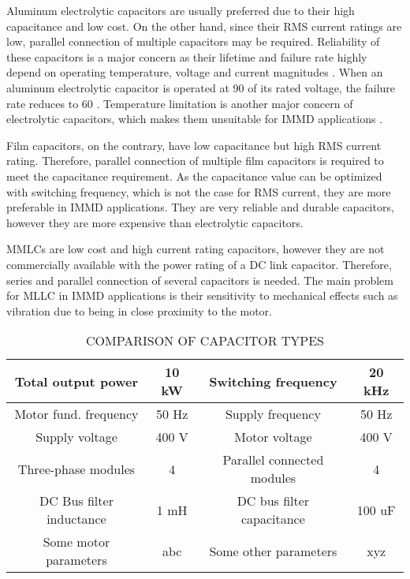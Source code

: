 \documentclass[conference,a4paper,twocolumn]{IEEEtran}
\begin{document}
Aluminum electrolytic capacitors are usually preferred due to their high capacitance and low cost. On the other hand, since their RMS current ratings are low, parallel connection of multiple capacitors may be required. Reliability of these capacitors is a major concern as their lifetime and failure rate highly depend on operating temperature, voltage and current magnitudes \cite{Su2010}. When an aluminum electrolytic capacitor is operated at 90 of its rated voltage, the failure rate reduces to 60 \cite{Bianchi2003}. Temperature limitation is another major concern of electrolytic capacitors, which makes them unsuitable for IMMD applications \cite{Brown2007}.

Film capacitors, on the contrary, have low capacitance but high RMS current rating. Therefore, parallel connection of multiple film capacitors is required to meet the capacitance requirement. As the capacitance value can be optimized with switching frequency, which is not the case for RMS current, they are more preferable in IMMD applications. They are very reliable and durable capacitors, however they are more expensive than electrolytic capacitors.

MMLCs are low cost and high current rating capacitors, however they are not commercially available with the power rating of a DC link capacitor. Therefore, series and parallel connection of several capacitors is needed. The main problem for MLLC in IMMD applications is their sensitivity to mechanical effects such as vibration \cite{Brown2007} due to being in close proximity to the motor.



\begin{table}[h]
\renewcommand{\arraystretch}{1.4}
\caption{COMPARISON OF CAPACITOR TYPES}
\label{table1}
\centering
\begin{tabular}{|c|c|c|c|}
\hline
Total output power & 10 kW & Switching frequency & 20 kHz\\
\hline
Motor fund. frequency & 50 Hz & Supply frequency & 50 Hz\\
\hline
Supply voltage & 400 V & Motor voltage & 400 V\\
\hline
Three-phase modules & 4 & Parallel connected modules & 4\\
\hline
DC Bus filter inductance & 1 mH & DC bus filter capacitance & 100 uF\\
\hline
Some motor parameters & abc & Some other parameters & xyz\\
\hline
\end{tabular}
\end{table}
\end{document}
